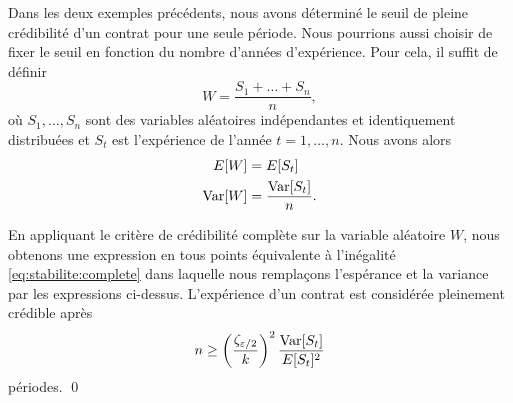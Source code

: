
\begin{exemple}
  \label{exemple:stabilite:nombre_annees}
  Dans les deux exemples précédents, nous avons déterminé le seuil de
  pleine crédibilité d'un contrat pour une seule période. Nous
  pourrions aussi choisir de fixer le seuil en fonction du nombre
  d'années d'expérience. Pour cela, il suffit de définir
  \begin{displaymath}
    W = \frac{S_1 + \dots + S_n}{n},
  \end{displaymath}
  où $S_1, \dots, S_n$ sont des variables aléatoires indépendantes et
  identiquement distribuées et $S_t$ est l'expérience de l'année
  $t = 1, \dots, n$.  Nous avons alors
  \begin{align*}
    E [ W ] &= E [ S_t ] \\
    \operatorname{Var} [ W ] &= \frac{\operatorname{Var} [ S_t ]}{n}.
  \end{align*}

  En appliquant le critère de crédibilité complète sur la variable
  aléatoire $W$, nous obtenons une expression en tous points
  équivalente à l'inégalité \eqref{eq:stabilite:complete} dans
  laquelle nous remplaçons l'espérance et la variance par les
  expressions ci-dessus. L'expérience d'un contrat est considérée
  pleinement crédible après
  \begin{equation*}
    n \geq
    \left(
      \frac{\zeta_{\varepsilon/2}}{k}
    \right)^2
    \frac{\operatorname{Var} [ S_t ]}{E [ S_t ]^2}
  \end{equation*}
  périodes.
  \qed
\end{exemple}




